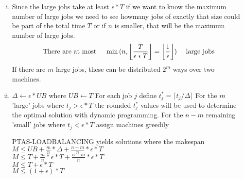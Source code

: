 \begin{enumerate}[(i)]
	\item Since the large jobs take at least $\epsilon * T$ if we want to know the maximum number of large jobs we need to see howmany jobs of exactly that size could be part of the total time $T$ or if $n$ is smaller, that will be the maximum number of large jobs. 
\[ \text{There are at most \hspace*{10pt}} \min{(n,\left \lfloor\frac{T}{\epsilon * T} \right \rfloor = \left \lfloor \frac{1}{\epsilon} \right \rfloor)} \text{\hspace*{10pt} large jobs} \] 
If there are $m$ large jobs, these can be distributed $2^m$ ways over two machines.
	\item 

\begin{sourcecode}
$\Delta \leftarrow \epsilon * UB$ where $UB \leftarrow T$ 
For each job $j$ define $t_j^* = \lceil t_j / \Delta \rceil$
For the $m$ 'large' jobs where $t_j > \epsilon * T$ the rounded $t_j^*$ values will be used to determine the optimal solution with dynamic programming. 
For the $n-m$ remaining 'small' jobs where $t_j < \epsilon * T$ assign machines greedily 
\qend
\end{sourcecode}

\textsc{PTAS-LOADBALANCING} yields solutions where the makespan \\
$M \leq UB + \frac{m}{n} * \Delta + \frac{n-m}{n} * \epsilon * T$\\
$M \leq T + \frac{m}{n} * \epsilon * T + \frac{n-m}{n} * \epsilon * T$\\
$M \leq T + \epsilon * T$\\
$M \leq (1+\epsilon) * T$\\

\end{enumerate}
